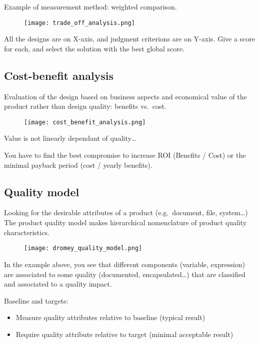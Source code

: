 Example of measurement method: weighted comparison.

\begin{figure}[!ht]
    \centering
    \texttt{[image: trade\_off\_analysis.png]}
\end{figure}

All the designs are on X-axis, and judgment criterions are on Y-axis. \newline
Give a score for each, and select the solution with the best global score.

\subsection{Cost-benefit analysis}

Evaluation of the design based on business aspects and economical value of the product rather than design quality: benefits vs.\ cost. \newline

\begin{figure}[!ht]
    \centering
    \texttt{[image: cost\_benefit\_analysis.png]}
\end{figure}

Value is not linearly dependant of quality\ldots \newline

You have to find the best compromise to increase ROI (Benefits / Cost) or the minimal payback period (cost / yearly benefits).

\subsection{Quality model}
Looking for the desirable attributes of a product (e.g.\ document, file, system\ldots)
The product quality model makes hierarchical nomenclature of product quality characteristics. \newline

\begin{figure}[!ht]
    \centering
    \texttt{[image: dromey\_quality\_model.png]}
\end{figure}

In the example above, you see that different components (variable, expression) are associated to some quality (documented, encapsulated\ldots) that are classified and associated to a quality impact. \newline

Baseline and targets:

\begin{itemize}
    \item Measure quality attributes relative to baseline (typical result)
    \item Require quality attribute relative to target (minimal acceptable result)
\end{itemize}
